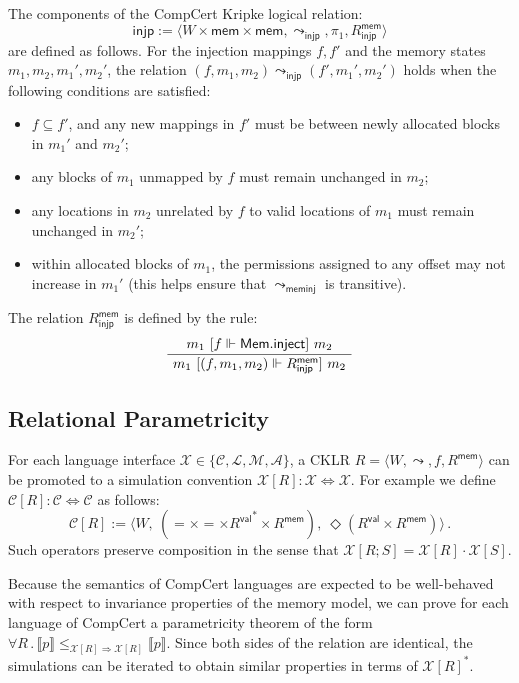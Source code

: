 \documentclass[sigplan,10pt,review,anonymous]{acmart}
\newcommand{\kw}[1]{\ensuremath{ \mathsf{#1} }}
\newcommand{\ifr}[1]{\ [{#1}]\ }
\begin{document}
\begin{definition}
The components of the CompCert Kripke logical relation:
\[ \kw{injp} :=
  \langle
    W \times \kw{mem} \times \kw{mem},
    \leadsto_\kw{injp}, \pi_1, R_\kw{injp}^\kw{mem}
  \rangle \]
are defined as follows.
For the injection mappings $f, f'$ and
the memory states $m_1, m_2, m_1', m_2'$,
the relation $(f, m_1, m_2) \leadsto_\kw{injp} (f', m_1', m_2')$
holds when the following conditions are satisfied:
\begin{itemize}
\item $f \subseteq f'$, and any new mappings in $f'$
  must be between newly allocated blocks in $m_1'$ and $m_2'$;
\item any blocks of $m_1$ unmapped by $f$
  must remain unchanged in $m_2$;
\item any locations in $m_2$ unrelated by $f$
  to valid locations of $m_1$ must remain unchanged in $m_2'$;
\item within allocated blocks of $m_1$,
  the permissions assigned to any offset may not increase in $m_1'$
  (this helps ensure that $\leadsto_\kw{meminj}$ is transitive).
\end{itemize}
The relation $R_\kw{injp}^\kw{mem}$ is defined by the rule:
\[
  \AxiomC{$m_1 \ifr{f \Vdash \kw{Mem.inject}} m_2$}
  \UnaryInfC{$m_1 \ifr{(f, m_1, m_2) \Vdash R_\kw{injp}^\kw{mem}} m_2$}
  \DisplayProof
\]
\end{definition}


\subsection{Relational Parametricity} \label{sec:compcert:param} %

For each language interface
$\mathcal{X} \in \{ \mathcal{C}, \mathcal{L}, \mathcal{M}, \mathcal{A} \}$,
a CKLR
$R = \langle W, {\leadsto}, f, R^\kw{mem} \rangle$ can be promoted to
a simulation convention
$\mathcal{X}[R] : \mathcal{X} \Leftrightarrow \mathcal{X}$.
For example
we define $\mathcal{C}[R] : \mathcal{C} \Leftrightarrow \mathcal{C}$
as follows:
\[
    \mathcal{C}[R] := \langle
      W, \:
      ({=} \times {=} \times {R^\kw{val}}^* \times R^\kw{mem}), \:
      \Diamond (R^\kw{val} \times R^\kw{mem})
    \rangle \,.
\]
Such operators preserve composition
in the sense that $\mathcal{X}[R ; S] = \mathcal{X}[R] \cdot \mathcal{X}[S]$.

Because the semantics of CompCert languages
are expected to be well-behaved with respect to
invariance properties of the memory model,
we can prove for each language of CompCert
a parametricity theorem of the form
$
    \forall R \,.\,
      \llbracket p \rrbracket
        \le_{\mathcal{X}[R] \Rightarrow \mathcal{X}[R]}
      \llbracket p \rrbracket
$.
Since both sides of the relation are identical,
the simulations can be iterated
to obtain similar properties in terms of $\mathcal{X}[R]^*$.
\end{document}
